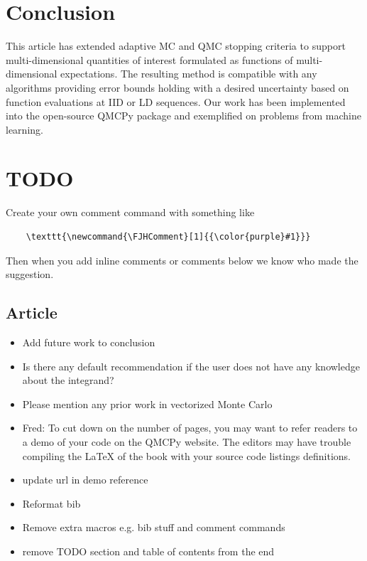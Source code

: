 \documentclass[graybox]{svmult}
\newcommand{\AGSComment}[1]{{\color{brown} #1}}
\newcommand{\JRComment}[1]{{\color{violet}#1}}
\newcommand{\FJHComment}[1]{{\color{purple}Fred:  #1}}
\begin{document}
\section{Conclusion} \label{sec:conclusions}

This article has extended adaptive MC and QMC stopping criteria to support multi-dimensional quantities of interest formulated as functions of multi-dimensional expectations. The resulting method is compatible with any algorithms providing error bounds holding with a desired uncertainty based on function evaluations at IID or LD sequences. Our work has been implemented into the open-source QMCPy package and exemplified on problems from machine learning. 

\printbibliography
% 
% 

\AGSComment{\section*{TODO}}

Create your own comment command with something like
\begin{verbatim}
    \texttt{\newcommand{\FJHComment}[1]{{\color{purple}#1}}}
\end{verbatim} 
Then when you add inline comments or comments below we know who made the suggestion. 

\subsection*{Article}

\begin{itemize}
    \item \AGSComment{Add future work to conclusion}
    \item \JRComment{Is there any default recommendation if the user does not have any knowledge about the integrand?}
    \item \JRComment{Please mention any prior work in vectorized Monte Carlo}
    \item \FJHComment{To cut down on the number of pages, you may want to refer readers to a demo of your code on the QMCPy website.  The editors may have trouble compiling the LaTeX of the book with your source code listings definitions.}
    \item \AGSComment{update url in demo reference}
    \item \AGSComment{Reformat bib}
    \item \AGSComment{Remove extra macros e.g. bib stuff and comment commands}
    \item \AGSComment{remove TODO section and table of contents from the end}
\end{itemize}
\end{document}
